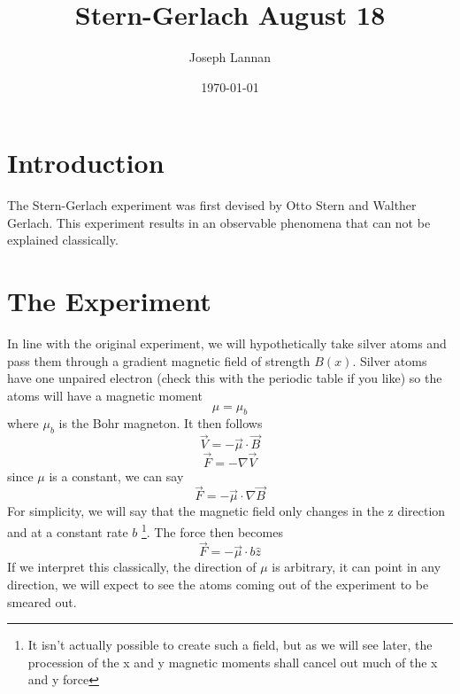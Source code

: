 \documentclass{article}
\title{Stern-Gerlach August 18}
\author{Joseph Lannan}
\date{\today}
\begin{document}
 
\maketitle
 
\section{Introduction}
 
The Stern-Gerlach experiment was first devised by Otto Stern and Walther Gerlach. This experiment results in an observable phenomena that can not be explained classically.


 
\section{The Experiment}
 
In line with the original experiment, we will hypothetically take silver atoms and pass them through a gradient magnetic field of strength $B(x)$. Silver atoms have one unpaired electron (check this with the periodic table if you like) so the atoms will have a magnetic moment
\[\mu = \mu_b\]
where $\mu_b$ is the Bohr magneton. It then follows
\[\vec{V} = -\vec{\mu}\cdot\vec{B}\]
\[\vec{F} = -\nabla\vec{V}\]
since $\mu$ is a constant, we can say
\[\vec{F} = -\vec{\mu}\cdot\nabla\vec{B}\]
For simplicity, we will say that the magnetic field only changes in the z direction and at a constant rate $b$ 
\footnote{It isn't actually possible to create such a field, but as we will see later, the procession of the x and y magnetic moments shall cancel out much of the x and y force}.
The force then becomes
\[\vec{F} = -\vec{\mu}\cdot b\hat{z}\]
If we interpret this classically, the direction of $\mu$ is arbitrary, it can point in any direction, we will expect to see the atoms coming out of the experiment to be smeared out.
\end{document}
